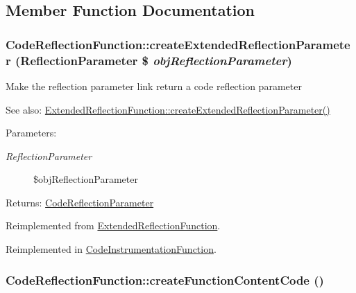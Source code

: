 \subsection{Member Function Documentation}
\hypertarget{class_code_reflection_function_7ce14d3f6e8579332f226d85fb439b80}{
\subsubsection[{createExtendedReflectionParameter}]{\setlength{\rightskip}{0pt plus 5cm}CodeReflectionFunction::createExtendedReflectionParameter (ReflectionParameter \$ {\em objReflectionParameter})}}
\label{class_code_reflection_function_7ce14d3f6e8579332f226d85fb439b80}


Make the reflection parameter link return a code reflection parameter

\begin{Desc}
\item[See also:]\hyperlink{class_extended_reflection_function_de07ccd452e54a7c8878fc20d215831e}{ExtendedReflectionFunction::createExtendedReflectionParameter()} \end{Desc}
\begin{Desc}
\item[Parameters:]
\begin{description}
\item[{\em ReflectionParameter}]\$objReflectionParameter \end{description}
\end{Desc}
\begin{Desc}
\item[Returns:]\hyperlink{class_code_reflection_parameter}{CodeReflectionParameter} \end{Desc}


Reimplemented from \hyperlink{class_extended_reflection_function_de07ccd452e54a7c8878fc20d215831e}{ExtendedReflectionFunction}.

Reimplemented in \hyperlink{class_code_instrumentation_function_3d95491ac661050b8e8ecedfaf3c8359}{CodeInstrumentationFunction}.\hypertarget{class_code_reflection_function_3ea191f1a3ff9fa0b3505327e635d306}{
\subsubsection[{createFunctionContentCode}]{\setlength{\rightskip}{0pt plus 5cm}CodeReflectionFunction::createFunctionContentCode ()}}
\label{class_code_reflection_function_3ea191f1a3ff9fa0b3505327e635d306}


